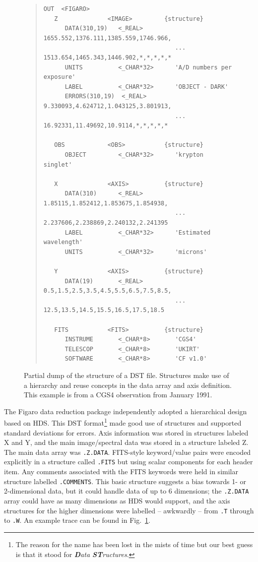 \documentclass[final,authoryear,5p,times,twocolumn]{elsarticle}
\begin{document}
\begin{figure}[t]
\begin{minipage}{\textwidth}
\begin{quote}
\small
\begin{verbatim}
OUT  <FIGARO>
   Z              <IMAGE>         {structure}
      DATA(310,19)   <_REAL>         1655.552,1376.111,1385.559,1746.966,
                                     ... 1513.654,1465.343,1446.902,*,*,*,*,*
      UNITS          <_CHAR*32>      'A/D numbers per exposure'
      LABEL          <_CHAR*32>      'OBJECT - DARK'
      ERRORS(310,19)  <_REAL>        9.330093,4.624712,1.043125,3.801913,
                                     ... 16.92331,11.49692,10.9114,*,*,*,*,*

   OBS            <OBS>           {structure}
      OBJECT         <_CHAR*32>      'krypton singlet'

   X              <AXIS>          {structure}
      DATA(310)      <_REAL>         1.85115,1.852412,1.853675,1.854938,
                                     ... 2.237606,2.238869,2.240132,2.241395
      LABEL          <_CHAR*32>      'Estimated wavelength'
      UNITS          <_CHAR*32>      'microns'

   Y              <AXIS>          {structure}
      DATA(19)       <_REAL>         0.5,1.5,2.5,3.5,4.5,5.5,6.5,7.5,8.5,
                                     ... 12.5,13.5,14.5,15.5,16.5,17.5,18.5

   FITS           <FITS>          {structure}
      INSTRUME       <_CHAR*8>       'CGS4'
      TELESCOP       <_CHAR*8>       'UKIRT'
      SOFTWARE       <_CHAR*8>       'CF v1.0'
\end{verbatim}
\end{quote}
\caption{Partial dump of the structure of a DST file. Structures make
  use of a hierarchy and reuse concepts in the data array and axis
  definition. This example is from a CGS4 observation from January
  1991.}
\label{fig:dst}
\end{minipage}
\end{figure}

The Figaro data reduction package
\citep[][ascl:1203.013]{1988igbo.conf..448C,1993ASPC...52..219S}
independently adopted a hierarchical design based on HDS. This DST
format\footnote{The reason for the name has been lost in the mists of
  time but our best guess is that it stood for \emph{\textbf{D}ata
    \textbf{ST}ructures}.} made good use of structures and supported
standard deviations for errors. Axis information was stored in
structures labeled X and Y, and the main image/spectral data was
stored in a structure labeled Z. The main data array was
\texttt{.Z.DATA}.  FITS-style keyword/value pairs were encoded
explicitly in a structure called \texttt{.FITS} but using scalar
components for each header item. Any comments associated with the FITS
keywords were held in similar structure labelled
\texttt{.COMMENTS}. This basic structure suggests a bias towards 1- or
2-dimensional data, but it could handle data of up to 6 dimensions;
the \texttt{.Z.DATA} array could have as many dimensions as HDS would
support, and the axis structures for the higher dimensions were
labelled -- awkwardly -- from \texttt{.T} through to \texttt{.W}. An
example trace can be found in Fig.\ \ref{fig:dst}.
\end{document}
